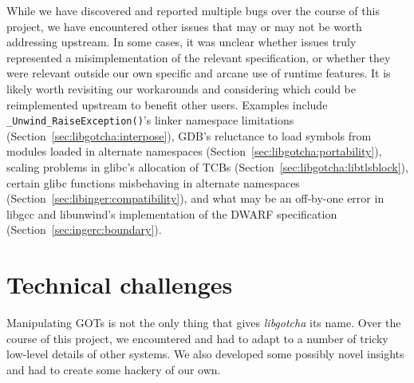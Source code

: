 While we have discovered and reported multiple bugs over the course of this project,
we have encountered other issues that may or may not be worth addressing upstream.
In some cases, it was unclear whether issues truly represented a misimplementation of
the relevant specification, or whether they were relevant outside our own specific
and arcane use of runtime features.  It is likely worth revisiting our workarounds
and considering which could be reimplemented upstream to benefit other users.
Examples include \texttt{\_Unwind\_RaiseException()}'s linker namespace limitations
(Section~\ref{sec:libgotcha:interpose}), GDB's reluctance to load symbols from
modules loaded in alternate namespaces (Section~\ref{sec:libgotcha:portability}),
scaling problems in glibc's allocation of TCBs
(Section~\ref{sec:libgotcha:libtlsblock}), certain glibc functions misbehaving in
alternate namespaces (Section~\ref{sec:libinger:compatibility}), and what may be an
off-by-one error in libgcc and libunwind's implementation of the DWARF specification
(Section~\ref{sec:ingerc:boundary}).


\section{Technical challenges}
\label{sec:thatsawrap:challenges}

Manipulating GOTs is not the only thing that gives \textit{libgotcha} its name.  Over
the course of this project, we encountered and had to adapt to a number of tricky
low-level details of other systems.  We also developed some possibly novel insights
and had to create some hackery of our own.

